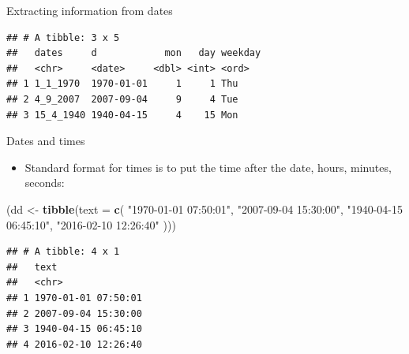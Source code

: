 \documentclass[
  ignorenonframetext,
]{beamer}
\newenvironment{Shaded}{\begin{snugshade}}{\end{snugshade}}
\newcommand{\DataTypeTok}[1]{\textcolor[rgb]{0.13,0.29,0.53}{#1}}
\newcommand{\KeywordTok}[1]{\textcolor[rgb]{0.13,0.29,0.53}{\textbf{#1}}}
\newcommand{\NormalTok}[1]{#1}
\newcommand{\OperatorTok}[1]{\textcolor[rgb]{0.81,0.36,0.00}{\textbf{#1}}}
\newcommand{\StringTok}[1]{\textcolor[rgb]{0.31,0.60,0.02}{#1}}
\providecommand{\tightlist}{%
  \setlength{\itemsep}{0pt}\setlength{\parskip}{0pt}}
\begin{document}
\begin{frame}[fragile]{Extracting information from dates}
\protect\hypertarget{extracting-information-from-dates}{}

\begin{Shaded}
\end{Shaded}

\begin{verbatim}
## # A tibble: 3 x 5
##   dates     d            mon   day weekday
##   <chr>     <date>     <dbl> <int> <ord>  
## 1 1_1_1970  1970-01-01     1     1 Thu    
## 2 4_9_2007  2007-09-04     9     4 Tue    
## 3 15_4_1940 1940-04-15     4    15 Mon
\end{verbatim}

\end{frame}

\begin{frame}[fragile]{Dates and times}
\protect\hypertarget{dates-and-times-1}{}

\begin{itemize}
\tightlist
\item
  Standard format for times is to put the time after the date, hours,
  minutes, seconds:
\end{itemize}

\begin{Shaded}
\begin{Highlighting}[]
\NormalTok{(dd <-}\StringTok{ }\KeywordTok{tibble}\NormalTok{(}\DataTypeTok{text =} \KeywordTok{c}\NormalTok{(}
  \StringTok{"1970-01-01 07:50:01"}\NormalTok{, }\StringTok{"2007-09-04 15:30:00"}\NormalTok{,}
  \StringTok{"1940-04-15 06:45:10"}\NormalTok{, }\StringTok{"2016-02-10 12:26:40"}
\NormalTok{)))}
\end{Highlighting}
\end{Shaded}

\begin{verbatim}
## # A tibble: 4 x 1
##   text               
##   <chr>              
## 1 1970-01-01 07:50:01
## 2 2007-09-04 15:30:00
## 3 1940-04-15 06:45:10
## 4 2016-02-10 12:26:40
\end{verbatim}

\end{frame}
\end{document}
